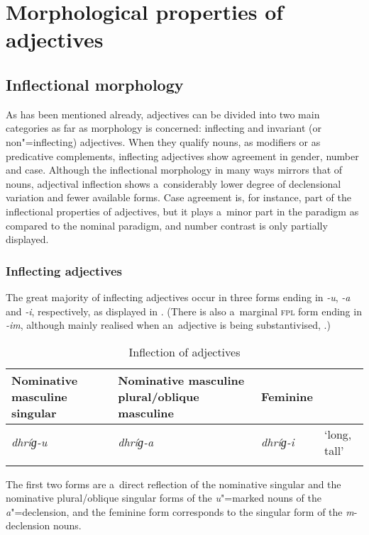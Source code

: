 \section{Morphological properties of adjectives}
\label{sec:6-3}

\subsection{Inflectional morphology}
\label{subsec:6-3-1}

As has been mentioned already, adjectives can be divided into two main categories as far as morphology is concerned: inflecting and invariant (or non"=inflecting) adjectives. When they qualify nouns, as modifiers or as predicative complements, inflecting adjectives show agreement in gender, number and case. Although the inflectional morphology in many ways mirrors that of nouns, adjectival inflection shows a~considerably lower degree of declensional variation and fewer available forms. Case agreement is, for instance, part of the inflectional properties of adjectives, but it plays a~minor part in the paradigm as compared to the nominal paradigm, and number contrast is only partially displayed.

\subsubsection*{Inflecting adjectives}

The great majority of inflecting adjectives occur in three forms ending in \textit{-u}, \textit{-a} and \textit{-i}, respectively, as displayed in . (There is also a~marginal \textsc{fpl} form ending in \textit{-im}, although mainly realised when an~adjective is being substantivised, .)


\begin{table}[ht]
\caption{Inflection of adjectives}
\begin{tabularx}{\textwidth}{ Q Q l l }
\lsptoprule
Nominative masculine singular &
Nominative masculine plural/oblique masculine &
Feminine &
\\\hline
\textit{dhríɡ-u} &
\textit{dhríɡ-a} &
\textit{dhríɡ-i} &
`long, tall'\\\lspbottomrule
\end{tabularx}
\label{tab:6-2}
\end{table}


The first two forms are a~direct reflection of the nominative singular and the nominative plural/oblique singular forms of the \textit{u}"=marked nouns of the \textit{a}"=declension, and the feminine form corresponds to the singular form of the \textit{m}-declension nouns.


